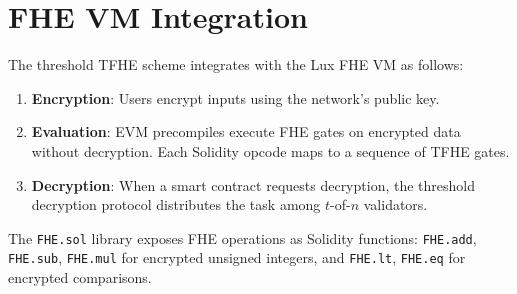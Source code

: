 \section{FHE VM Integration}

\label{sec:fhevm}

The threshold TFHE scheme integrates with the Lux FHE VM as follows:

\begin{enumerate}[nosep]
\item \textbf{Encryption}: Users encrypt inputs using the network's public key.
\item \textbf{Evaluation}: EVM precompiles execute FHE gates on encrypted data without
decryption. Each Solidity opcode maps to a sequence of TFHE gates.
\item \textbf{Decryption}: When a smart contract requests decryption, the threshold
decryption protocol distributes the task among $t$-of-$n$ validators.
\end{enumerate}

The \texttt{FHE.sol} library exposes FHE operations as Solidity functions:
\texttt{FHE.add}, \texttt{FHE.sub}, \texttt{FHE.mul} for encrypted unsigned integers,
and \texttt{FHE.lt}, \texttt{FHE.eq} for encrypted comparisons.

